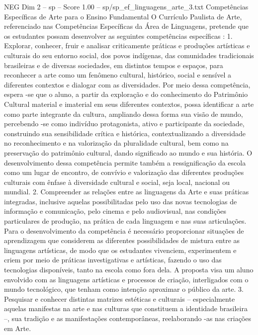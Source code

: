 \begin{textsample}{NEG Dim 2 – sp – Score 1.00 – sp/sp\_ef\_linguagens\_arte\_3.txt}  \label{ex:f2_neg_085}
Competências Específicas de Arte para o Ensino Fundamental O Currículo Paulista de Arte, referenciado nas Competências Específicas da Área de Linguagens, pretende que os estudantes possam desenvolver as seguintes competências específicas : 1.
Explorar, conhecer, fruir e analisar criticamente práticas e produções artísticas e culturais do seu entorno social, dos povos indígenas, das comunidades tradicionais brasileiras e de diversas sociedades, em distintos tempos e espaços, para reconhecer a arte como um fenômeno cultural, histórico, social e sensível a diferentes contextos e dialogar com as diversidades.
Por meio dessa competência, espera -se que o aluno, a partir da exploração e do conhecimento do Patrimônio Cultural material e imaterial em seus diferentes contextos, possa identificar a arte como parte integrante da cultura, ampliando dessa forma sua visão de mundo, percebendo -se como indivíduo protagonista, ativo e participante da sociedade, construindo sua sensibilidade crítica e histórica, contextualizando a diversidade no reconhecimento e na valorização da pluralidade cultural, bem como na preservação do patrimônio cultural, dando significado ao mundo e sua história.
O desenvolvimento dessa competência permite também a ressignificação da escola como um lugar de encontro, de convívio e valorização das diferentes produções culturais com ênfase à diversidade cultural e social, seja local, nacional ou mundial. 2.
Compreender as relações entre as linguagens da Arte e suas práticas integradas, inclusive aquelas possibilitadas pelo uso das novas tecnologias de informação e comunicação, pelo cinema e pelo audiovisual, nas condições particulares de produção, na prática de cada linguagem e nas suas articulações.
Para o desenvolvimento da competência é necessário proporcionar situações de aprendizagem que considerem as diferentes possibilidades de mistura entre as linguagens artísticas, de modo que os estudantes vivenciem, experimentem e criem por meio de práticas investigativas e artísticas, fazendo o uso das tecnologias disponíveis, tanto na escola como fora dela.
A proposta visa um aluno envolvido com as linguagens artísticas e processos de criação, interligados com o mundo tecnológico, que tenham como intenção aproximar o público da arte. 3.
Pesquisar e conhecer distintas matrizes estéticas e culturais – especialmente aquelas manifestas na arte e nas culturas que constituem a identidade brasileira –, sua tradição e as manifestações contemporâneas, reelaborando -as nas criações em Arte.

\end{textsample}
